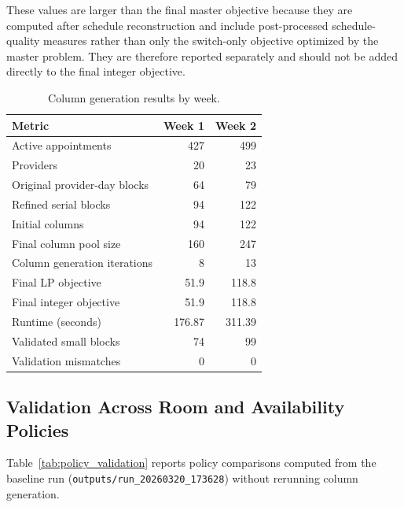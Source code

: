 \documentclass[12pt]{article}
\begin{document}
These values are larger than the final master objective because they are computed after schedule
reconstruction and include post-processed schedule-quality measures rather than only the
switch-only objective optimized by the master problem. They are therefore reported separately
and should not be added directly to the final integer objective.

\begin{table}[h]
  \centering
  \caption{Column generation results by week.}
  \label{tab:results}
  \begin{tabular}{lrr}
    \toprule
    Metric & Week 1 & Week 2 \\
    \midrule
    Active appointments              & 427    & 499    \\
    Providers                        & 20     & 23     \\
    Original provider-day blocks     & 64     & 79     \\
    Refined serial blocks            & 94     & 122    \\
    Initial columns                  & 94     & 122    \\
    Final column pool size           & 160    & 247    \\
    Column generation iterations     & 8      & 13     \\
    Final LP objective               & 51.9   & 118.8  \\
    Final integer objective          & 51.9   & 118.8  \\
    Runtime (seconds)                & 176.87 & 311.39 \\
    Validated small blocks           & 74     & 99     \\
    Validation mismatches            & 0      & 0      \\
    \bottomrule
  \end{tabular}
\end{table}

\subsection*{Validation Across Room and Availability Policies}

Table~\ref{tab:policy_validation} reports policy comparisons computed from the baseline run
(\texttt{outputs/run\_20260320\_173628}) without rerunning column generation.
\end{document}
